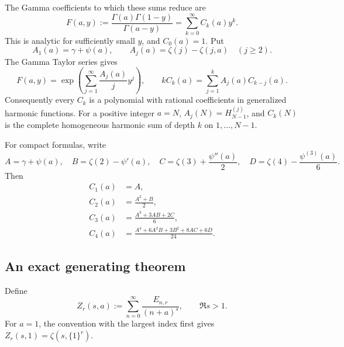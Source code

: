 The Gamma coefficients to which these sums reduce are
\begin{equation}\label{harm:eq:gamma-coefficients}
 F(a,y):=\frac{\Gamma(a)\Gamma(1-y)}{\Gamma(a-y)}
       =\sum_{k=0}^{\infty}C_k(a)y^k.
\end{equation}
This is analytic for sufficiently small $y$, and $C_0(a)=1$.  Put
\begin{equation}\label{harm:eq:generalized-harmonics}
 A_1(a)=\gamma+\psi(a),\qquad
 A_j(a)=\zeta(j)-\zeta(j,a)\quad(j\ge2).
\end{equation}
The Gamma Taylor series gives
\begin{equation}\label{harm:eq:bell-generator}
 F(a,y)=\exp\left(\sum_{j=1}^{\infty}\frac{A_j(a)}j y^j\right),
 \qquad
 kC_k(a)=\sum_{j=1}^{k} A_j(a)C_{k-j}(a).
\end{equation}
Consequently every $C_k$ is a polynomial with rational coefficients in
generalized harmonic functions.  For a positive integer $a=N$,
$A_j(N)=H_{N-1}^{(j)}$, and $C_k(N)$ is the complete homogeneous
harmonic sum of depth $k$ on $1,\ldots,N-1$.

For compact formulas, write
\begin{equation}\label{harm:eq:ABCD}
 A=\gamma+\psi(a),\quad B=\zeta(2)-\psi'(a),\quad
 C=\zeta(3)+\frac{\psi''(a)}2,\quad
 D=\zeta(4)-\frac{\psi^{(3)}(a)}6.
\end{equation}
Then
\begin{align}
 C_1(a)&=A,\\
 C_2(a)&=\frac{A^2+B}{2},\\
 C_3(a)&=\frac{A^3+3AB+2C}{6},\\
 C_4(a)&=\frac{A^4+6A^2B+3B^2+8AC+6D}{24}.
 \label{harm:eq:first-C}
\end{align}

\subsection{An exact generating theorem}

Define
\begin{equation}\label{harm:eq:shifted-series}
 Z_r(s,a):=\sum_{n=0}^{\infty}\frac{E_{n,r}}{(n+a)^s},
 \qquad \Re s>1.
\end{equation}
For $a=1$, the convention with the largest index first gives
$Z_r(s,1)=\zeta(s,\{1\}^r)$.

